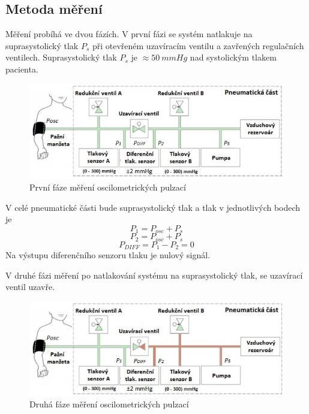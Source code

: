 \subsection{Metoda měření} \label{section:metoda_mereni}
Měření probíhá ve dvou fázích. V první fázi se systém natlakuje na suprasystolický tlak $P_s$ při otevřeném uzavíracím ventilu a zavřených regulačních ventilech. Suprasystolický tlak $P_s$ je $\approx 50 \ mmHg$ nad systolickým tlakem pacienta.
\begin{figure}[H]
    \includegraphics[width=1\linewidth]{pictures/faze_mereni_1.jpg}
    \caption{První fáze měření oscilometrických pulzací \cite{cite:Habilitace}}
\end{figure}
V celé pneumatické části bude suprasystolický tlak a tlak v jednotlivých bodech je
\begin{equation*}
    P_1 = P_{osc} + P_s
\end{equation*}
\begin{equation*}
    P_2 = P_{osc} + P_s
\end{equation*}
\begin{equation*}
    P_{DIFF} = P_1 - P_2 = 0
\end{equation*}
Na výstupu diferenčního senzoru tlaku je nulový signál. \par
V druhé fázi měření po natlakování systému na suprasystolický tlak, se uzavírací ventil uzavře.
\begin{figure}[H]
    \includegraphics[width=1\linewidth]{pictures/faze_mereni_2.jpg}
    \caption{Druhá fáze měření oscilometrických pulzací \cite{cite:Habilitace}}
\end{figure}
